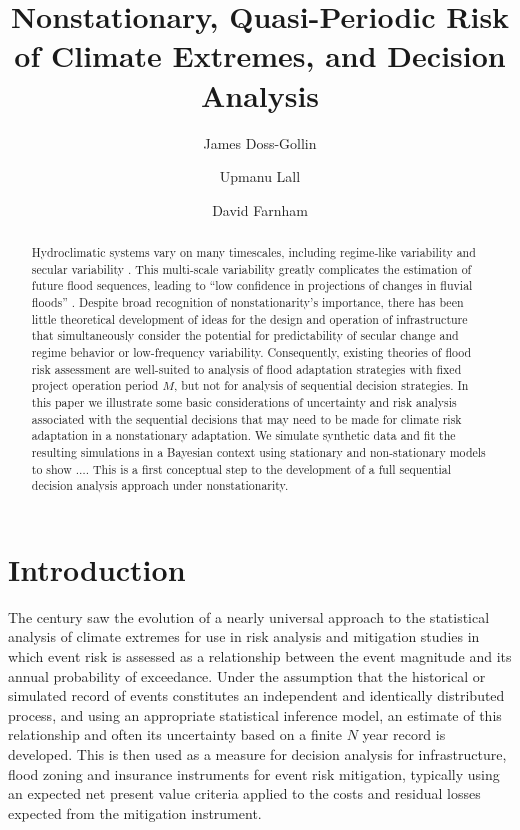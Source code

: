 \documentclass[12pt]{article}
\title{Nonstationary, Quasi-Periodic Risk of Climate Extremes, and Decision Analysis}
\author[1,2]{James Doss-Gollin}
\author[1,2]{Upmanu Lall}
\author[1,2]{David Farnham}
\affil[1]{Columbia Water Center, Columbia University}
\affil[2]{Department of Earth and Environmental Engineering, Columbia University}
\begin{document}
\maketitle
\RaggedRight{}
\begin{abstract}
  Hydroclimatic systems vary on many timescales, including regime-like variability and secular variability  \citep[``nonstationarity'';][]{Milly2008,Merz2014,Hodgkins2017}.
  This multi-scale variability greatly complicates the estimation of future flood sequences, leading to ``low confidence in projections of changes in fluvial floods'' \citep{IPCC2012}.
  Despite broad recognition of nonstationarity's importance, there has been little theoretical development of ideas for the design and operation of infrastructure that simultaneously consider the potential for predictability of secular change and regime behavior or low-frequency variability.
  Consequently, existing theories of flood risk assessment are well-suited to analysis of flood adaptation strategies with fixed project operation period \(M\), but not for analysis of sequential decision strategies.
  In this paper we illustrate some basic considerations of uncertainty and risk analysis associated with the sequential decisions that may need to be made for climate risk adaptation in a nonstationary adaptation.
  We simulate synthetic data and fit the resulting simulations in a Bayesian context using stationary and non-stationary models to show \(\ldots{}\).
  This is a first conceptual step to the development of a full sequential decision analysis approach under nonstationarity.
\end{abstract}


\section{Introduction}

The  century saw the evolution of a nearly universal approach to the statistical analysis of climate extremes for use in risk analysis and mitigation studies \citep[\ie{} Bulletin 17-B for flood frequency analysis;][]{IACWD1982} in which event risk is assessed as a relationship between the event magnitude and its annual probability of exceedance.
Under the assumption that the historical or simulated record of events constitutes an independent and identically distributed process, and using an appropriate statistical inference model, an estimate of this relationship and often its uncertainty based on a finite \(N\) year record is developed.
This is then used as a measure for decision analysis for infrastructure, flood zoning and insurance instruments for event risk mitigation, typically using an expected net present value criteria applied to the costs and residual losses expected from the mitigation instrument.
\end{document}

